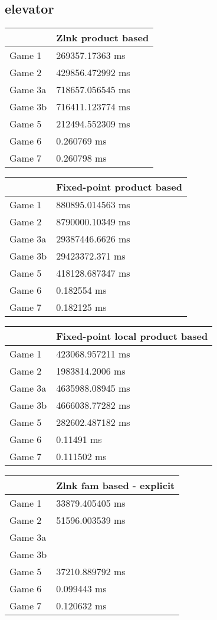 \subsection{elevator}
\begin{tabular}{|l|l|}
	\hline
	& Zlnk product based \\ \hline
	Game 1 & 269357.17363 ms \\ \hline
	Game 2 & 429856.472992 ms \\ \hline
	Game 3a & 718657.056545 ms \\ \hline
	Game 3b & 716411.123774 ms \\ \hline
	Game 5 & 212494.552309 ms \\ \hline
	Game 6 & 0.260769 ms \\ \hline
	Game 7 & 0.260798 ms \\ \hline
\end{tabular}
\begin{tabular}{|l|l|}
	\hline
	& Fixed-point product based \\ \hline
	Game 1 & 880895.014563 ms \\ \hline
	Game 2 & 8790000.10349 ms \\ \hline
	Game 3a & 29387446.6626 ms \\ \hline
	Game 3b & 29423372.371 ms \\ \hline
	Game 5 & 418128.687347 ms \\ \hline
	Game 6 & 0.182554 ms \\ \hline
	Game 7 & 0.182125 ms \\ \hline
\end{tabular}
\begin{tabular}{|l|l|}
	\hline
	& Fixed-point local product based \\ \hline
	Game 1 & 423068.957211 ms \\ \hline
	Game 2 & 1983814.2006 ms \\ \hline
	Game 3a & 4635988.08945 ms \\ \hline
	Game 3b & 4666038.77282 ms \\ \hline
	Game 5 & 282602.487182 ms \\ \hline
	Game 6 & 0.11491 ms \\ \hline
	Game 7 & 0.111502 ms \\ \hline
\end{tabular}
\begin{tabular}{|l|l|}
	\hline
	& Zlnk fam based - explicit \\ \hline
	Game 1 & 33879.405405 ms \\ \hline
	Game 2 & 51596.003539 ms \\ \hline
	Game 3a & \dag \\ \hline
	Game 3b & \dag \\ \hline
	Game 5 & 37210.889792 ms \\ \hline
	Game 6 & 0.099443 ms \\ \hline
	Game 7 & 0.120632 ms \\ \hline
\end{tabular}
